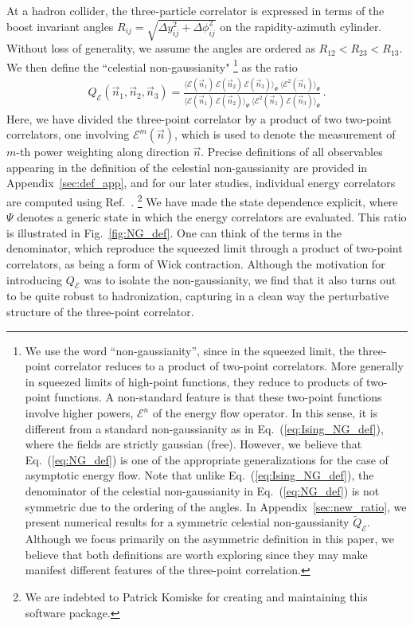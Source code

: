 \documentclass[letterpaper,11pt]{article}
\def\Fig#1{Fig.~{\ref{#1}}}
\def\App#1{Appendix~\ref{#1}}
\DeclareRobustCommand{\App}[1]{App.~\ref{#1}}
\DeclareRobustCommand{\Fig}[1]{Fig.~\ref{#1}}
\DeclareRobustCommand{\Eq}[1]{Eq.~(\ref{#1})}
\DeclareRobustCommand{\Ref}[1]{Ref.~\cite{#1}}
\def\cE{\mathcal{E}}
\def\cE{\mathcal{E}}
\begin{document}
At a hadron collider, the three-particle correlator is expressed in terms of the boost invariant angles $R_{ij}=\sqrt{\Delta y_{ij}^2 + \Delta \phi_{ij}^2}$ on the rapidity-azimuth cylinder.
%
Without loss of generality, we assume the angles are ordered as $R_{12} < R_{23} < R_{13}$. We then define the ``celestial non-gaussianity"%
%
\footnote{We use the word ``non-gaussianity'', since in the squeezed limit, the three-point correlator reduces to a product of two-point correlators. More generally in squeezed limits of high-point functions, they reduce to products of two-point functions. A non-standard feature is that these two-point functions involve higher powers, $\cE^n$ of the energy flow operator. In this sense, it is different from a standard non-gaussianity as in \Eq{eq:Ising_NG_def}, where the fields are strictly gaussian (free). However, we believe that \Eq{eq:NG_def} is one of the appropriate generalizations for the case of asymptotic energy flow. 
%
Note that unlike \Eq{eq:Ising_NG_def}, the denominator of the celestial non-gaussianity in \Eq{eq:NG_def} is not symmetric due to the ordering of the angles. In \App{sec:new_ratio}, we present numerical results for a symmetric celestial non-gaussianity $\widetilde{Q}_{\mathcal{E}}$. Although we focus primarily on the asymmetric definition in this paper, we believe that both definitions are worth exploring since they may make manifest different features of the three-point correlation.
} as the ratio
%
\begin{align}\label{eq:NG_def}
\boxed{Q_{\mathcal{E}}(\vec n_1, \vec n_2, \vec n_3)=\frac{\langle\mathcal{E}(\vec{n}_1)\, \mathcal{E}(\vec{n}_2)\, \mathcal{E}(\vec{n}_3)\rangle_{\Psi} ~ \langle\mathcal{E}^2(\vec{n}_1)\rangle_{\Psi} }
{\langle\mathcal{E}(\vec{n}_1)\, \mathcal{E}(\vec{n}_2)\rangle_{\Psi}  ~ \langle\mathcal{E}^2(\vec{n}_1)\, \mathcal{E}(\vec{n}_3)\rangle_{\Psi} }\,. }
\end{align}
%
Here, we have divided the three-point correlator by a product of two two-point correlators, one involving $\mathcal{E}^m(\vec{n})$, which is used to denote the measurement of $m$-th power weighting along direction $\vec{n}$.
%
Precise definitions of all observables appearing in the definition of the celestial non-gaussianity are provided in \App{sec:def_app}, and for our later studies, individual energy correlators are computed using \Ref{EEC_github}.%
%
\footnote{We are indebted to Patrick Komiske for creating and maintaining this software package.}
%
We have made the state dependence explicit, where $\Psi$ denotes a generic state in which the energy correlators are evaluated.
%
This ratio is illustrated in  \Fig{fig:NG_def}.
%
One can think of the terms in the denominator, which reproduce the squeezed limit through a product of two-point correlators, as being a form of Wick contraction.
%
Although the motivation for introducing $Q_\cE$ was to isolate the non-gaussianity, we find that it also turns out to be quite robust to hadronization, capturing in a clean way the perturbative structure of the three-point correlator.
%
\end{document}
